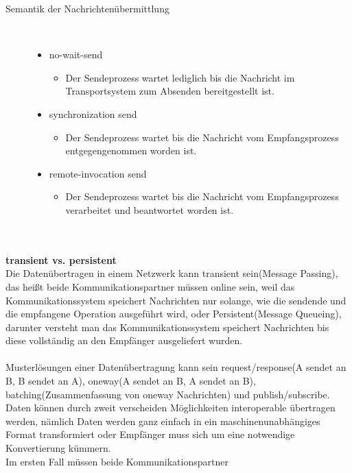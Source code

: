 \documentclass[a4paper,12pt]{article}
\begin{document}
\begin{description}
    \item[Semantik der Nachrichtenübermittlung] ~\par
    \begin{itemize}
        \item no-wait-send
        \begin{itemize}
            \item{Der Sendeprozess wartet lediglich bis die Nachricht im Transportsystem zum Absenden bereitgestellt ist.}
        \end{itemize}
        \item synchronization send
        \begin{itemize}
            \item{Der Sendeprozess wartet bis die Nachricht vom Empfangsprozess entgegengenommen worden ist.}
        \end{itemize}
        \item remote-invocation send
        \begin{itemize}
            \item{Der Sendeprozess wartet bis die Nachricht vom Empfangsprozess verarbeitet und beantwortet worden ist.\\\\\\}
        \end{itemize}
    \end{itemize} 
\end{description}
\textbf{transient vs. persistent\\}
Die Datenübertragen in einem Netzwerk kann transient sein(Message Passing), das heißt beide Kommunikationspartner müssen online sein, weil das Kommunikationssystem speichert Nachrichten nur solange, wie die
sendende und die empfangene Operation ausgeführt wird, oder Persistent(Message Queueing), darunter versteht man das Kommunikationssystem speichert Nachrichten bis diese vollständig an den Empfänger ausgeliefert wurden.\\\\
Musterlösungen einer Datenübertragung kann sein request/response(A sendet an B, B sendet an A), oneway(A sendet an B, A sendet an B), batching(Zusammenfassung von oneway Nachrichten) und publish/subscribe. Daten können durch zweit verscheiden Möglichkeiten interoperable übertragen werden, nämlich Daten werden ganz einfach in ein maschinenunabhängiges Format transformiert oder Empfänger muss sich um eine notwendige Konvertierung kümmern.\\ Im ersten Fall müssen beide Kommunikationspartner
\end{document}
